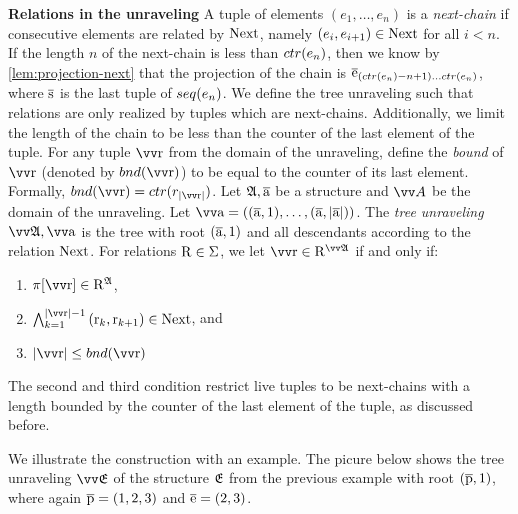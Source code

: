 \noindent
\textbf{Relations in the unraveling}
A tuple of elements $(e_{1}, \ldots, e_{n})$ is a \emph{next-chain} if consecutive elements are related by $\mathrm{Next}$, namely $(e_{i}, e_{i+1}) \in \mathrm{Next}$ for all $i < n$.
If the length $n$ of the next-chain is less than $\ctr{e_{n}}$, then we know by \cref{lem:projection-next} that the projection of the chain is $\elemtuplee_{(\ctr{e_{n}}-n+1)\ldots{}\ctr{e_{n}}}$, where $\overline{\mathrm{s}}$ is the last tuple of $\seq{e_{n}}$.
We define the tree unraveling such that relations are only realized by tuples which are next-chains.
Additionally, we limit the length of the chain to be less than the counter of the last element of the tuple.
For any tuple $\elemtuptupler$ from the domain of the unraveling, define the \emph{bound} of $\elemtuptupler$ (denoted by $\bound{\elemtuptupler}$) to be equal to the counter of its last element.
Formally, $\bound{\elemtuptupler} = \ctr{r_{|\elemtuptupler|}}$.
Let ${\mathfrak{A}}, \overline{\mathrm{a}}$ be a structure and $\unraveldom{A}$ be the domain of the unraveling.
Let $\elemtuptuplea = ((\elemtuplea, 1), \ldots, (\elemtuplea, |\elemtuplea|))$.
The \emph{tree unraveling} $\unravel{A}, \elemtuptuplea$ is the tree with root $(\overline{\mathrm{a}}, 1)$ and all descendants according to the relation $\mathrm{Next}$.
For relations $\mathrm{R} \in \Sigma$, we let $\elemtuptupler \in \relR^{\unravel{A}}$ if and only if:\begin{enumerate}
  \item $\pi[\elemtuptupler] \in \relR^{\str{A}}$,
  \item $\bigwedge_{k=1}^{|\elemtuptupler|-1}{(\elemr_{k},\elemr_{k+1}) \in \relNext}$, and
  \item $|\elemtuptupler| \le \bound{\elemtuptupler}$
\end{enumerate}
The second and third condition restrict live tuples to be next-chains with a length bounded by the counter of the last element of the tuple, as discussed before.

We illustrate the construction with an example.
The picure below shows the tree unraveling $\unravel{E}$ of the structure ${\mathfrak{E}}$ from the previous example with root $(\overline{\mathrm{p}}, 1)$, where again $\overline{\mathrm{p}} = (1,2,3)$ and $\overline{\mathrm{e}} = (2,3)$.
\begin{figure}[H]
  \centering
  
\end{figure}


